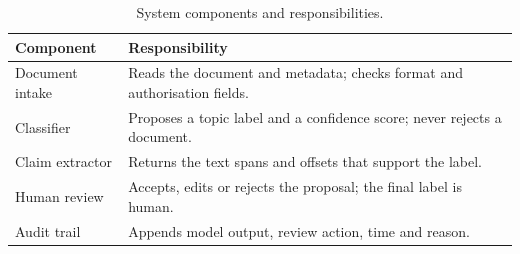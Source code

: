 \begin{table}[htbp]
  \centering
  \formaltable
  \begin{tabularx}{\textwidth}{|B|Y|}
    \hline
    \textbf{Component} & \textbf{Responsibility} \\ \hline
    Document intake & Reads the document and metadata; checks format and authorisation fields. \\ \hline
    Classifier & Proposes a topic label and a confidence score; never rejects a document. \\ \hline
    Claim extractor & Returns the text spans and offsets that support the label. \\ \hline
    Human review & Accepts, edits or rejects the proposal; the final label is human. \\ \hline
    Audit trail & Appends model output, review action, time and reason. \\ \hline
  \end{tabularx}
  \caption{System components and responsibilities.}
  \label{tab:components}
\end{table}
